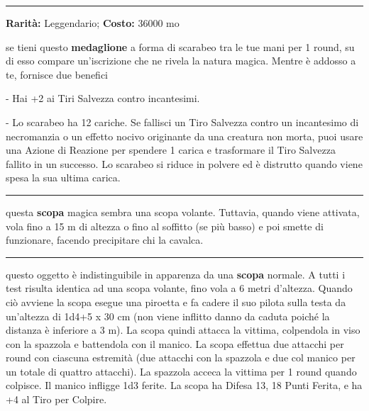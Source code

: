 \begin{multicols}{2}
\smallskip\noindent\rule{\linewidth}{2pt}  \hypertarget{ScarabeodiProtezione}{}\smallskip{}\noindent\label{ScarabeodiProtezione}

\textbf{Rarità:} Leggendario; \textbf{Costo:} 36000 mo

se tieni questo \textbf{medaglione} a forma di scarabeo tra le tue mani per 1 round, su di esso compare un'iscrizione che ne rivela la natura magica. Mentre è addosso a te, fornisce due benefici

- Hai +2 ai Tiri Salvezza contro incantesimi.

- Lo scarabeo ha 12 cariche. Se fallisci un Tiro Salvezza contro un incantesimo di necromanzia o un effetto nocivo originante da una creatura non morta, puoi usare una Azione di Reazione per spendere 1 carica e trasformare il Tiro Salvezza fallito in un successo. Lo scarabeo si riduce in polvere ed è distrutto quando viene spesa la sua ultima carica.

\smallskip\noindent\rule{\linewidth}{2pt}  \hypertarget{ScopadelVolomaledetto}{}\smallskip{}\noindent\label{ScopadelVolomaledetto}

questa \textbf{scopa} magica sembra una scopa volante. Tuttavia, quando viene attivata, vola fino a 15 m di altezza o fino al soffitto (se più basso) e poi smette di funzionare, facendo precipitare chi la cavalca.

\smallskip\noindent\rule{\linewidth}{2pt}  \hypertarget{Scopadell'Attaccoanimato}{}\smallskip{}\noindent\label{Scopadell'Attaccoanimato}

questo oggetto è indistinguibile in apparenza da una \textbf{scopa} normale. A tutti i test risulta identica ad una scopa volante, fino vola a 6 metri d'altezza. Quando ciò avviene la scopa esegue una piroetta e fa cadere il suo pilota sulla testa da un'altezza di 1d4+5 x 30 cm (non viene inflitto danno da caduta poiché la distanza è inferiore a 3 m). La scopa quindi attacca la vittima, colpendola in viso con la spazzola e battendola con il manico. La scopa effettua due attacchi per round con ciascuna estremità (due attacchi con la spazzola e due col manico per un totale di quattro attacchi). La spazzola acceca la vittima per 1 round quando colpisce. Il manico infligge 1d3 ferite. La scopa ha Difesa 13, 18 Punti Ferita, e ha +4 al Tiro per Colpire.


\end{multicols}
